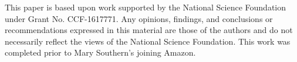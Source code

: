 \documentclass[sigconf]{acmart}
\begin{document}
\maketitle










\begin{acks}
This paper is based upon work supported by the National Science
Foundation under Grant No. CCF-1617771.
%
Any opinions, findings, and conclusions or recommendations expressed
in this material are those of the authors and do not necessarily
reflect the views of the National Science Foundation.
%
This work was completed prior to Mary Southern's joining Amazon.
\end{acks}
  

%

\end{document}
